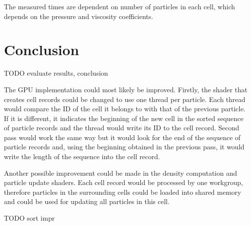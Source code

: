 \documentclass[a4paper,report]{IEEEtran}
\begin{document}
The measured times are dependent on number of particles in each cell, which depends on the pressure and viscosity coefficients.


\section{Conclusion}
\label{sec:improvements}
TODO evaluate results, conclusion

The GPU implementation could most likely be improved. Firstly, the shader that creates cell records could be changed to use one thread per particle. Each thread would compare the ID of the cell it belongs to with that of the previous particle. If it is different, it indicates the beginning of the new cell in the sorted sequence of particle records and the thread would write its ID to the cell record. Second pass would work the same way but it would look for the end of the sequence of particle records and, using the beginning obtained in the previous pass, it would write the length of the sequence into the cell record.

Another possible improvement could be made in the density computation and particle update shaders. Each cell record would be processed by one workgroup, therefore particles in the surrounding cells could be loaded into shared memory and could be used for updating all particles in this cell.

TODO sort impr

%
%
\end{document}
